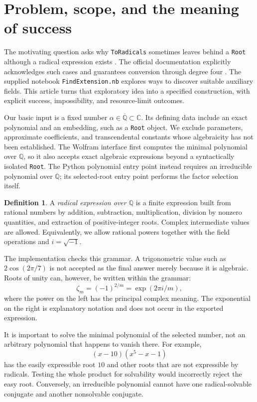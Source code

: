 \documentclass[11pt,a4paper]{article}
\theoremstyle{definition}
\newtheorem{definition}[theorem]{Definition}
\theoremstyle{remark}
\newcommand{\Q}{\mathbb Q}
\newcommand{\C}{\mathbb C}
\newcommand{\code}[1]{\texttt{#1}}
\newcommand{\z}{\zeta}
\begin{document}
\begingroup
\small
\setlength{\parskip}{0pt}
\tableofcontents
\endgroup
\newpage

\section{Problem, scope, and the meaning of success}
\label{sec:scope}
The motivating question asks why \code{ToRadicals} sometimes leaves behind a
\code{Root} although a radical expression exists \cite{question}. The official
documentation explicitly acknowledges such cases and guarantees conversion
through degree four \cite{toradicals}. The supplied notebook
\code{FindExtension.nb} explores ways to discover suitable auxiliary fields.
This article turns that exploratory idea into a specified construction, with
explicit success, impossibility, and resource-limit outcomes.

Our basic input is a fixed number $\alpha\in\overline{\Q}\subset\C$.
Its defining data include an exact polynomial and an embedding, such as a
\code{Root} object. We exclude parameters, approximate coefficients, and
transcendental constants whose algebraicity has not been established. The
Wolfram interface first computes the minimal polynomial over $\Q$, so it also
accepts exact algebraic expressions beyond a syntactically isolated
\code{Root}. The Python polynomial entry point instead requires an irreducible
polynomial over $\Q$; its selected-root entry point performs the factor
selection itself.

\begin{definition}
A \emph{radical expression over $\Q$} is a finite expression built from rational
numbers by addition, subtraction, multiplication, division by nonzero
quantities, and extraction of positive-integer roots. Complex intermediate
values are allowed. Equivalently, we allow rational powers together with the
field operations and $i=\sqrt{-1}$.
\end{definition}
The implementation checks this grammar. A trigonometric value such as
$2\cos(2\pi/7)$ is not accepted as the final answer merely because it is
algebraic. Roots of unity can, however, be written within the grammar:
\begin{equation}\label{eq:zeta-principal}
 \z_m=(-1)^{2/m}=\exp(2\pi i/m),
\end{equation}
where the power on the left has the principal complex meaning. The exponential
on the right is explanatory notation and does not occur in the exported
expression.

It is important to solve the minimal polynomial of the selected number, not
an arbitrary polynomial that happens to vanish there. For example,
\[
 (x-10)(x^5-x-1)
\]
has the easily expressible root $10$ and other roots that are not expressible
by radicals. Testing the whole product for solvability would incorrectly
reject the easy root. Conversely, an irreducible polynomial cannot have one
radical-solvable conjugate and another nonsolvable conjugate.
\end{document}
